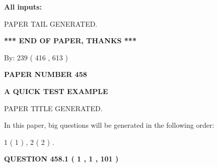 \documentclass[12pt]{article}
\begin{document}
   
   
   
\noindent{}
   
   
   
   
\noindent\vspace{0.1in}\hspace{-0.08in} {\textbf{\Large{All inputs: }}}
   
   
   
   
   
   
 \vspace{0.2in}
 
   
   
\vspace{2.0in} PAPER TAIL GENERATED.
   
   
   
   
\vspace{1.0in} 
{\textbf{\large{ *** END OF PAPER, THANKS *** }}} 
   
   
\hspace{1.0in} By: 
 239 ( 416 ,  613 )
   
   
   
   
\newpage 
\setcounter{page}{ 
   458001 } 
   
   
   
   
 {\textbf{ \Large{ PAPER NUMBER  458  }}}
   
   
\vspace{0.2in}
   
   
   
   
   
   
   
   
 \vspace{0.2in}
{\LARGE {\textbf{ A QUICK TEST EXAMPLE}}}
   
   
 PAPER TITLE GENERATED.
   
   
   
\vspace{0.2in}
   
In this paper, big questions will be generated in the following order: 
   
   
   1 ( 1 )
 ,
   2 ( 2 )
 .
  
\vspace{0.2in}
  
{\textbf{\Large{QUESTION
458.1 
 ( 1 , 1 , 101 )
}}}
  
  
 
\end{document}
